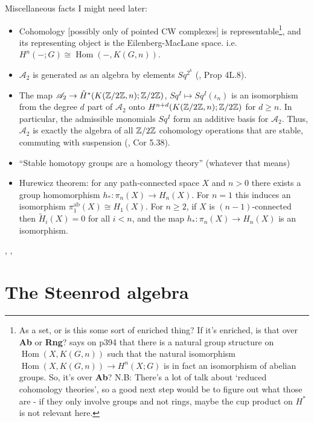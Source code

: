 \documentclass{MetricNotes2023}
\def\inte{\ensuremath\mathbb{Z}}
\DeclareMathOperator{\Hom}{Hom}
\begin{document}
Miscellaneous facts I might need later:
\begin{itemize}
\item Cohomology [possibly only of pointed%
CW complexes] is representable\footnote{As a set, or is this some sort of enriched thing? If it's enriched, is that over \textbf{Ab} or \textbf{Rng}? \autocite{hatcher} says on p394 that there is a natural group structure on \(\Hom(X,K(G,n))\) such that the natural isomorphism \(\Hom(X,K(G,n))\to H^n(X;G)\) is in fact an isomorphism of abelian groups. So, it's over \textbf{Ab}? N.B: There's a lot of talk about `reduced cohomology theories', so a good next step would be to figure out what those are - if they only involve groups and not rings, maybe the cup product on \(H^*\) is not relevant here.}, and its representing object is the Eilenberg-MacLane space.  i.e. \(H^n(-; G)\cong \Hom(-, K(G, n))\). 
\item \(\mathscr A_2\) is generated as an algebra by elements \(Sq^{2^k}\) (\autocite{hatcher}, Prop 4L.8).
\item The map \(\mathscr A_2 \to \tilde H^*(K(\inte/2\inte, n); \inte/2\inte)\), \(Sq^I\mapsto Sq^I(\iota_n)\) is an isomorphism from the degree \(d\) part of \(\mathscr A_2\) onto \(H^{n+d}(K(\inte/2\inte, n); \inte/2\inte)\) for \(d \geq n\). In particular, the admissible monomials \(Sq^I\) form an additive basis for \(\mathscr A_2\). Thus, \(\mathscr A_2\) is exactly the algebra of all \(\inte/2\inte\) cohomology operations that are stable, commuting with suspension (\autocite{hatcher5}, Cor 5.38). 
\item ``Stable homotopy groups are a homology theory'' (whatever that means)
\item Hurewicz theorem: for any path-connected space \(X\) and \(n>0\) there exists a group homomorphism \(h_* : \pi_n(X)\to H_n(X)\). For \(n=1\) this induces an isomorphism \(\pi_1^{\text{ab}}(X)\cong H_1(X)\). For \(n \geq 2\), if \(X\) is \((n-1)\)-connected then \(\tilde H_i(X)=0\) for all \(i<n\), and the map \(h_* : \pi_n(X)\to H_n(X)\) is an isomorphism. 
\end{itemize}

\autocite{ass}, \autocite{suspension}, \autocite{hatcher}

\section{The Steenrod algebra}
\end{document}
